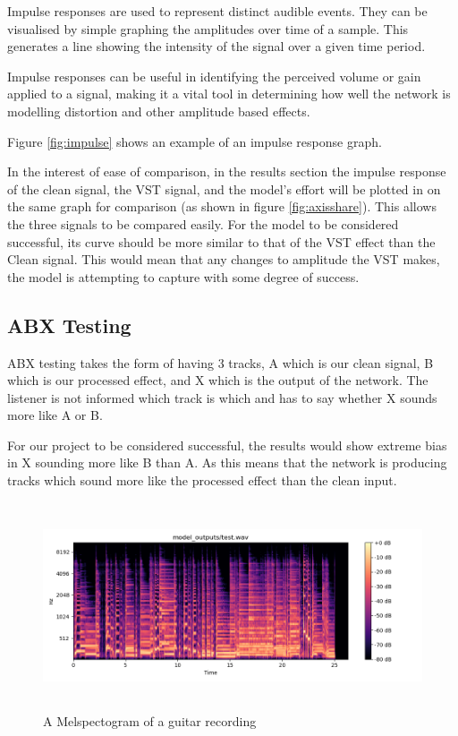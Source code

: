 \documentclass{l4proj}
\begin{document}
Impulse responses are used to represent distinct audible events. They
can be visualised by simple graphing the amplitudes over time of a
sample. This generates a line showing the intensity of the signal over a
given time period.

Impulse responses can be useful in identifying the perceived volume or
gain applied to a signal, making it a vital tool in determining how well
the network is modelling distortion and other amplitude based effects.

Figure \ref{fig:impulse} shows an example of an impulse response graph.

In the interest of ease of comparison, in the results section the
impulse response of the clean signal, the VST signal, and the model's
effort will be plotted in on the same graph for comparison (as shown in
figure \ref{fig:axisshare}). This allows the three signals to be
compared easily. For the model to be considered successful, its curve
should be more similar to that of the VST effect than the Clean signal.
This would mean that any changes to amplitude the VST makes, the model
is attempting to capture with some degree of success.

\subsection{ABX Testing}\label{abx-testing}

ABX testing takes the form of having 3 tracks, A which is our clean
signal, B which is our processed effect, and X which is the output of
the network. The listener is not informed which track is which and has
to say whether X sounds more like A or B.

For our project to be considered successful, the results would show
extreme bias in X sounding more like B than A. As this means that the
network is producing tracks which sound more like the processed effect
than the clean input.

\begin{figure}
\centering
\includegraphics[width=6.00000in,height=2.40000in]{images/spect.png}
\caption{A Melspectogram of a guitar recording\label{fig:spectogram}}
\end{figure}
\end{document}

